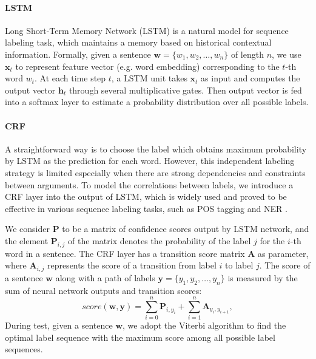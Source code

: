 \documentclass{article}
\begin{document}
\paragraph{LSTM}
Long Short-Term Memory Network (LSTM) \cite{hochreiter1997long} is a natural model for sequence labeling task, which maintains a memory based on historical contextual information. Formally, given a sentence $\bm{w} = \{w_1, w_2, \dots, w_n\}$ of length $n$, we use $\textbf{x}_t$ to represent feature vector (e.g. word embedding) corresponding to the $t$-th word $w_t$. At each time step $t$, a LSTM unit takes $\textbf{x}_t$ as input and computes the output vector $\textbf{h}_t$ through several multiplicative gates. Then output vector is fed into a softmax layer to estimate a probability distribution over all possible labels.

\paragraph{CRF}
A straightforward way is to choose the label which obtains maximum probability by LSTM as the prediction for each word. However, this independent labeling strategy is limited especially when there are strong dependencies and constraints between arguments.
To model the correlations between labels, we introduce a CRF layer into the output of LSTM, which is widely used and proved to be effective in various sequence labeling tasks, such as POS tagging and NER \cite{collobert2011natural,huang2015bidirectional,lample2016neural}.

We consider $\textbf{P}$ to be a matrix of confidence scores output by LSTM network, and the element $\textbf{P}_{i,j}$ of the matrix denotes the probability of the label $j$ for the $i$-th word in a sentence. The CRF layer has a transition score matrix $\textbf{A}$ as parameter, where $\textbf{A}_{i,j}$ represents the score of a transition from label $i$ to label $j$. The score of a sentence $\bm{w}$ along with a path of labels $\bm{y} = \{y_1, y_2, \ldots, y_n\}$ is measured by the sum of neural network outputs and transition scores: 
\begin{equation}
	score(\bm{w}, \bm{y}) = \sum\limits_{i=0}^n\textbf{P}_{i, y_i} + \sum\limits_{i=1}^n\textbf{A}_{y_i, y_{i+1}},
\end{equation}
During test, given a sentence $\bm{w}$, we adopt the Viterbi algorithm \cite{rabiner1989tutorial} to find the optimal label sequence with the maximum score among all possible label sequences.
\end{document}
